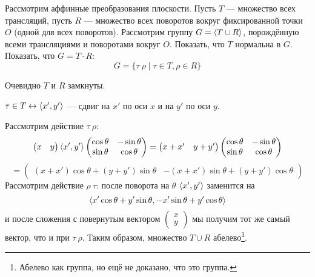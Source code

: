 \begin{exercise}
    Рассмотрим аффинные преобразования плоскости. Пусть \(T\) --- множество всех трансляций, пусть \(R\) --- множество всех поворотов вокруг фиксированной точки \(O\) (одной для всех поворотов). Рассмотрим группу \(G = \ev{T \cup R}\), порождённую всеми трансляциями и поворотами вокруг \(O\). Показать, что \(T\) нормальна в \(G\). Показать, что \(G = T \cdot R\):
    \[G = \{\tau\ \rho \mid \tau \in T, \rho \in R\}\]
\end{exercise}
\begin{solution}
    Очевидно \(T\) и \(R\) замкнуты.

    \begin{obozn}
        \(\tau \in T \leftrightarrow \ev{x', y'}\) --- сдвиг на \(x'\) по оси \(x\) и на \(y'\) по оси \(y\).
    \end{obozn}

    Рассмотрим действие \(\tau\ \rho\):
    \[\begin{pmatrix}
            x & y
        \end{pmatrix} \ev{x', y'} \begin{pmatrix}
            \cos \theta & - \sin \theta \\
            \sin \theta & \cos \theta
        \end{pmatrix} = \begin{pmatrix}
            x + x' & y + y'
        \end{pmatrix} \begin{pmatrix}
            \cos \theta & - \sin \theta \\
            \sin \theta & \cos \theta
        \end{pmatrix}\]
    \[= \begin{pmatrix}
            (x + x') \cos \theta + (y + y') \sin \theta &
            - (x + x') \sin \theta + (y + y') \cos \theta
        \end{pmatrix}\]
    Рассмотрим действие \(\rho\ \tau\): после поворота на \(\theta\) \(\ev{x', y'}\) заменится на
    \[\ev{x' \cos \theta + y' \sin \theta, - x' \sin \theta + y' \cos \theta}\]
    и после сложения с повернутым вектором \(\begin{pmatrix}
        x \\ y
    \end{pmatrix}\) мы получим тот же самый вектор, что и при \(\tau\ \rho\). Таким образом, множество \(T \cup R\) абелево\footnote{Абелево как группа, но ещё не доказано, что это группа.}.


\end{solution}
